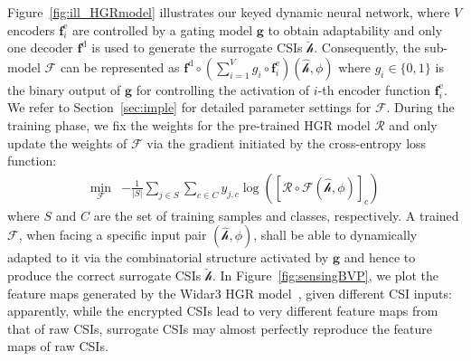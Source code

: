 \documentclass[conference,compsoc]{IEEEtran}
\newcommand{\rev}[1]{{\color{blue}#1}}      %
\newcommand{\rev}[1]{#1}
\begin{document}
Figure~\ref{fig:ill_HGRmodel} illustrates our keyed dynamic neural network, where $V$ encoders $\mathbf{f}^{\mathrm{e}}_i$ are controlled by a gating model $\mathbf{g}$ to obtain adaptability and only one decoder $\mathbf{f}^{\mathrm{d}}$ is used to generate the surrogate CSIs $\breve{\bm{\mathcal{h}}}$. Consequently, the sub-model $ \mathcal{F} $ can be represented as \rev{
$ \mathbf{f}^{\mathrm{d}} \circ ( \sum_{i = 1}^{V}  g_{i}  \circ \mathbf{f}^{\mathrm{e}}_i ) ( \bm{\hat{\bm{\mathcal{h}}}} , \phi )  $ }where $g_i  \in \{ 0, 1 \}$ is the binary output of $\mathbf{g}$ for controlling the activation of $i$-th encoder function $\mathbf{f}^{\mathrm{e}}_i $. We refer to Section~\ref{sec:imple} for detailed parameter settings for $ \mathcal{F} $.
During the training phase, we fix the weights for the pre-trained HGR model $\mathcal{R}$ and only update the weights of $\mathcal{F}$ via the gradient initiated by the cross-entropy loss function: 
%
\begin{align} \label{eq:deCNN}
	\min_{\mathcal{F}} &  - \frac{1}{ |S| }  \sum_{j \in S}^{} \sum_{c \in C}^{}  y_{j,c} \log \left( [\mathcal{R } \circ \mathcal{F} \left(\bm{\hat{\bm{\mathcal{h}}}}, \phi \right) ]_c \right)
\end{align}
%
where $S$ and $C$ are the set of training samples and classes, respectively. A trained $ \mathcal{F} $, when facing a specific input pair $(\bm{\hat{\bm{\mathcal{h}}}} , \phi)$, shall be able to dynamically adapted to it via the combinatorial structure activated by $\mathbf{g}$ and hence to produce the correct surrogate CSIs $\breve{\bm{\mathcal{h}}}$. In Figure~\ref{fig:sensingBVP}, we plot the feature maps generated by the Widar3 HGR model~\cite{Widar3-MobiSys19}, given different CSI inputs: apparently, while the encrypted CSIs lead to very different feature maps from that of raw CSIs, surrogate CSIs may almost perfectly reproduce the feature maps of raw CSIs.
 

\vspace{-1ex}
\end{document}
